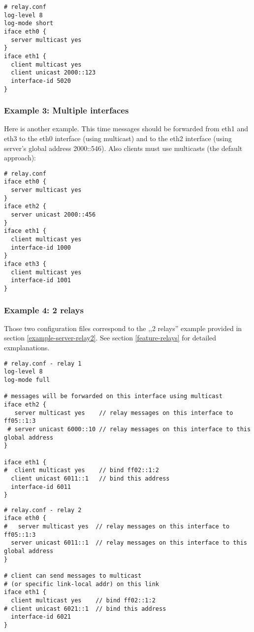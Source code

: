 \begin{lstlisting}
# relay.conf
log-level 8
log-mode short
iface eth0 {
  server multicast yes
}
iface eth1 {
  client multicast yes
  client unicast 2000::123
  interface-id 5020
}
\end{lstlisting}

\subsubsection{Example 3: Multiple interfaces}
\label{example-relay-multiple}
Here is another example. This time messages should be forwarded from
eth1 and eth3 to the eth0 interface (using multicast) and to the eth2
interface (using server's global address 2000::546). Also clients must
use multicasts (the default approach):

\begin{lstlisting}
# relay.conf
iface eth0 {
  server multicast yes
}
iface eth2 {
  server unicast 2000::456
}
iface eth1 {
  client multicast yes
  interface-id 1000
}
iface eth3 {
  client multicast yes
  interface-id 1001
}
\end{lstlisting}

\subsubsection{Example 4: 2 relays}
\label{example-relay-cascade}
Those two configuration files correspond to the ,,2 relays'' example
provided in section \ref{example-server-relay2}. See section
\ref{feature-relays} for detailed exmplanations.

\begin{lstlisting}
# relay.conf - relay 1
log-level 8
log-mode full

# messages will be forwarded on this interface using multicast
iface eth2 {
   server multicast yes    // relay messages on this interface to ff05::1:3
 # server unicast 6000::10 // relay messages on this interface to this global address
}

iface eth1 {
#  client multicast yes    // bind ff02::1:2
  client unicast 6011::1   // bind this address
  interface-id 6011
}
\end{lstlisting}

\begin{lstlisting}
# relay.conf - relay 2
iface eth0 {
#   server multicast yes  // relay messages on this interface to ff05::1:3
  server unicast 6011::1  // relay messages on this interface to this global address
}

# client can send messages to multicast
# (or specific link-local addr) on this link
iface eth1 {
  client multicast yes    // bind ff02::1:2
# client unicast 6021::1  // bind this address
  interface-id 6021
}
\end{lstlisting}

